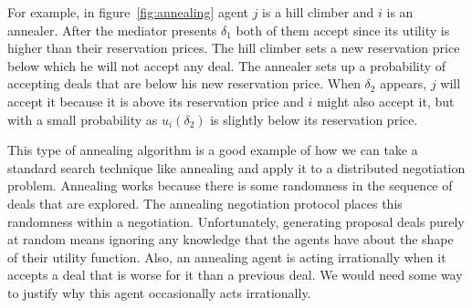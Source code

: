 For example, in figure~\ref{fig:annealing} agent $j$ is a hill climber
and $i$ is an annealer. After the mediator presents $\delta_1$ both of
them accept since its utility is higher than their reservation prices.
The hill climber sets a new reservation price below which he will not
accept any deal. The annealer sets up a probability of accepting deals
that are below his new reservation price. When $\delta_2$ appears, $j$
will accept it because it is above its reservation price and $i$ might
also accept it, but with a small probability as $u_i(\delta_2)$ is
slightly below its reservation price.





This type of annealing algorithm is a good example of how we can take
a standard search technique like annealing and apply it to a
distributed negotiation problem. Annealing works because there is some
randomness in the sequence of deals that are explored. The annealing
negotiation protocol places this randomness within a negotiation.
Unfortunately, generating proposal deals purely at random means
ignoring any knowledge that the agents have about the shape of their
utility function. Also, an annealing agent is acting irrationally when
it accepts a deal that is worse for it than a previous deal. We would
need some way to justify why this agent occasionally acts
irrationally.



